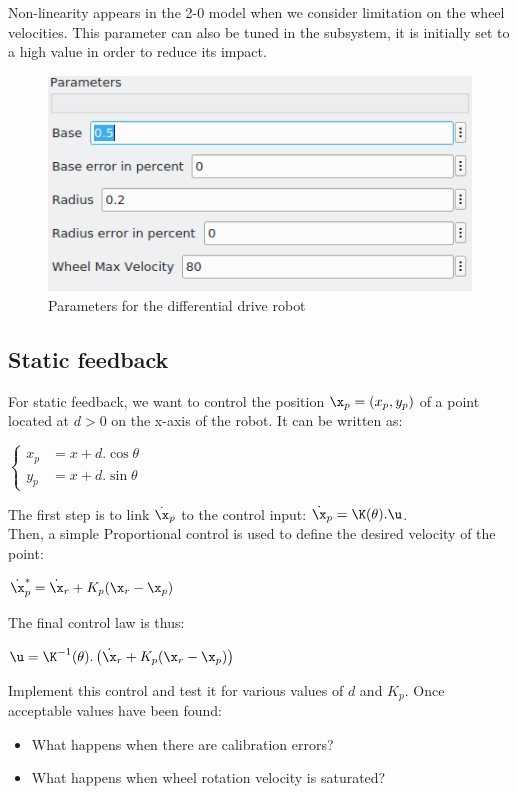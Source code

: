 \documentclass{ecnreport}
\begin{document}
Non-linearity appears in the 2-0 model when we consider limitation on the wheel velocities. This parameter can also be tuned in the subsystem, it is initially set to a high value in order to reduce its impact.

\begin{figure}[ht]
\centering
\includegraphics[width=0.4\linewidth]{param20}
\caption{Parameters for the differential drive robot}
\end{figure}

\subsection{Static feedback}

For static feedback, we want to control the position $\x_p = (x_p,y_p)$ of a point located at $d > 0$ on the x-axis of the robot.
It can be written as: 
\begin{center}
 $\left\{\begin{array}{ll}
         x_p &= x + d.\cos\theta \\
         y_p &= x + d.\sin\theta 
        \end{array}\right.$
\end{center}
The first step is to link $\dot \x_p$ to the control input: $\dot \x_p = \K(\theta).\u$.
\\

Then, a simple Proportional control is used to define the desired velocity of the point:
\begin{center}
$\dot \x_p^* = \dot \x_r + K_p(\x_r - \x_p)$
\end{center}
The final control law is thus:
\begin{center}
$\u = \K^{-1}(\theta) .\left(\dot \x_r + K_p(\x_r - \x_p)\right)$
\end{center}

Implement this control and test it for various values of $d$ and $K_p$. Once acceptable values have been found:
\begin{itemize}
 \item What happens when there are calibration errors?
 \item What happens when wheel rotation velocity is saturated?
\end{itemize} 
\end{document}
